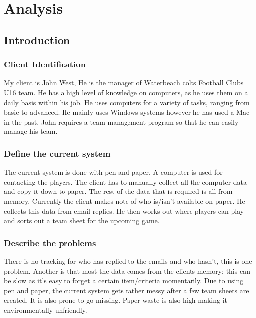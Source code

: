 \chapter{Analysis}

\section{Introduction}

\subsection{Client Identification}
My client is John West, He is the manager of Waterbeach colts Football Clubs U16 team.  He has a high level of knowledge on computers, as he uses them on a daily basis within his job. He uses computers for a variety of tasks, ranging from basic to advanced. He mainly uses Windows systems however he has used a Mac in the past. John requires a team management program so that he can easily manage his team.
\subsection{Define the current system}
The current system is done with pen and paper. A computer is used for contacting the players. The client has to manually collect all the computer data and copy it down to paper. The rest of the data that is required is all from memory. Currently the client makes note of who is/isn't available on paper. He collects this data from email replies.  He then works out where players can play and sorts out a team sheet for the upcoming game.
\subsection{Describe the problems}
There is no tracking for who has replied to the emails and who hasn't, this is one problem.  Another is that most the data comes from the clients memory; this can be slow as it's easy to forget a certain item/criteria momentarily. Due to using pen and paper, the current system gets rather messy after a few team sheets are created. It is also prone to go missing. Paper waste is also high making it environmentally unfriendly.

